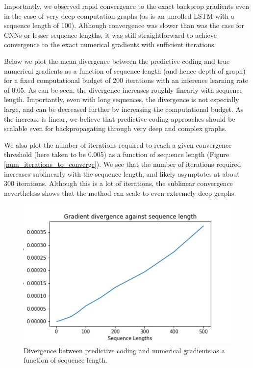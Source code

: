 Importantly, we observed rapid convergence to the exact backprop gradients even in the case of very deep computation graphs (as is an unrolled LSTM with a sequence length of 100). Although convergence was slower than was the case for CNNs or lesser sequence lengths, it was still straightforward to achieve convergence to the exact numerical gradients with sufficient iterations.

Below we plot the mean divergence between the predictive coding and true numerical gradients as a function of sequence length (and hence depth of graph) for a fixed computational budget of 200 iterations with an inference learning rate of 0.05. As can be seen, the divergence increases roughly linearly with sequence length. Importantly, even with long sequences, the divergence is not especially large, and can be decreased further by increasing the computational budget. As the increase is linear, we believe that predictive coding approaches should be scalable even for backpropagating through very deep and complex graphs.

We also plot the number of iterations required to reach a given convergence threshold (here taken to be 0.005) as a function of sequence length (Figure \ref{num_iterations_to_converge}). We see that the number of iterations required increases sublinearly with the sequence length, and likely asymptotes at about 300 iterations. Although this is a lot of iterations, the sublinear convergence nevertheless shows that the method can scale to even extremely deep graphs.

\begin{figure}[ht]
  \centering
  \includegraphics[width=.9\linewidth]{chapter_6_figures/lstm_seqlen_divergences.jpg}  
\caption{Divergence between predictive coding and numerical gradients as a function of sequence length.}
\label{sequence_length_effect}

\end{figure}


